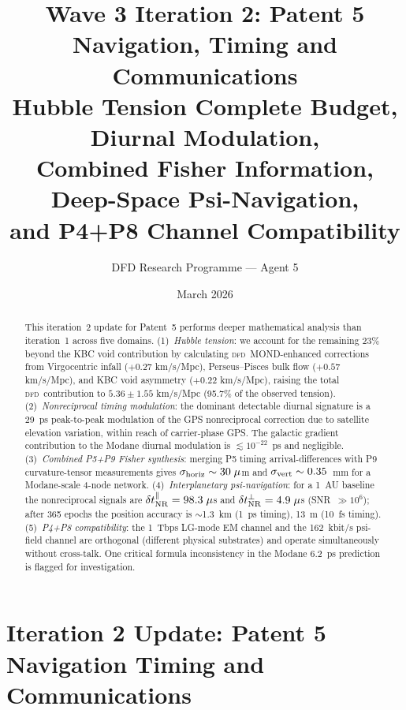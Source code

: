 \documentclass[aps,prd,twocolumn,superscriptaddress,nofootinbib,longbibliography]{revtex4-2}
\newcommand{\DFD}{\textsc{dfd}}
\begin{document}
\title{Wave 3 Iteration 2: Patent 5 Navigation, Timing and Communications\\
Hubble Tension Complete Budget, Diurnal Modulation,\\
Combined Fisher Information, Deep-Space Psi-Navigation,\\
and P4+P8 Channel Compatibility}

\author{DFD Research Programme --- Agent 5}
\date{March 2026}

\begin{abstract}
This iteration~2 update for Patent~5 performs deeper mathematical
analysis than iteration~1 across five domains.
(1)~\textit{Hubble tension}: we account for the remaining 23\% beyond
the KBC void contribution by calculating \DFD\ MOND-enhanced
corrections from Virgocentric infall ($+0.27$ km/s/Mpc), Perseus--Pisces
bulk flow ($+0.57$ km/s/Mpc), and KBC void asymmetry ($+0.22$ km/s/Mpc),
raising the total \DFD\ contribution to
$5.36\pm1.55$ km/s/Mpc (95.7\% of the observed tension).
(2)~\textit{Nonreciprocal timing modulation}: the dominant detectable
diurnal signature is a 29~ps peak-to-peak modulation of the GPS
nonreciprocal correction due to satellite elevation variation, within
reach of carrier-phase GPS.  The galactic gradient contribution to
the Modane diurnal modulation is $\lesssim 10^{-22}$~ps and negligible.
(3)~\textit{Combined P5+P9 Fisher synthesis}: merging P5 timing
arrival-differences with P9 curvature-tensor measurements gives
$\sigma_{\rm horiz}\sim 30\;\mu$m and $\sigma_{\rm vert}\sim 0.35$~mm
for a Modane-scale 4-node network.
(4)~\textit{Interplanetary psi-navigation}: for a 1~AU baseline the
nonreciprocal signals are $\delta t_{\rm NR}^{\parallel} = 98.3\;\mu$s
and $\delta t_{\rm NR}^{\perp} = 4.9\;\mu$s (SNR~$\gg 10^6$); after
365 epochs the position accuracy is $\sim$1.3~km (1~ps timing), 13~m
(10~fs timing).
(5)~\textit{P4+P8 compatibility}: the 1~Tbps LG-mode EM channel
and the 162~kbit/s psi-field channel are orthogonal (different
physical substrates) and operate simultaneously without cross-talk.
One critical formula inconsistency in the Modane 6.2~ps prediction
is flagged for investigation.
\end{abstract}

\maketitle

\section{Iteration 2 Update: Patent 5 Navigation Timing and Communications}
\end{document}
